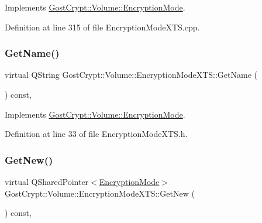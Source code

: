 Implements \hyperlink{class_gost_crypt_1_1_volume_1_1_encryption_mode_a2879197c50f2e834f22d87def6c3ec0f}{Gost\+Crypt\+::\+Volume\+::\+Encryption\+Mode}.



Definition at line 315 of file Encryption\+Mode\+X\+T\+S.\+cpp.

\mbox{\label{class_gost_crypt_1_1_volume_1_1_encryption_mode_x_t_s_a3e4b43e1295accb96021b03deaa5e7b1}} 
\subsubsection{\texorpdfstring{Get\+Name()}{GetName()}}
{\footnotesize\ttfamily virtual Q\+String Gost\+Crypt\+::\+Volume\+::\+Encryption\+Mode\+X\+T\+S\+::\+Get\+Name (\begin{DoxyParamCaption}{ }\end{DoxyParamCaption}) const\hspace{0.3cm}{\ttfamily [inline]}, {\ttfamily [virtual]}}



Implements \hyperlink{class_gost_crypt_1_1_volume_1_1_encryption_mode_a8b82c75eb29a3149b1dd171624c3ede1}{Gost\+Crypt\+::\+Volume\+::\+Encryption\+Mode}.



Definition at line 33 of file Encryption\+Mode\+X\+T\+S.\+h.

\mbox{\label{class_gost_crypt_1_1_volume_1_1_encryption_mode_x_t_s_a3d9c88420585ed76c1c11f541db973e1}} 
\subsubsection{\texorpdfstring{Get\+New()}{GetNew()}}
{\footnotesize\ttfamily virtual Q\+Shared\+Pointer$<$\hyperlink{class_gost_crypt_1_1_volume_1_1_encryption_mode}{Encryption\+Mode}$>$ Gost\+Crypt\+::\+Volume\+::\+Encryption\+Mode\+X\+T\+S\+::\+Get\+New (\begin{DoxyParamCaption}{ }\end{DoxyParamCaption}) const\hspace{0.3cm}{\ttfamily [inline]}, {\ttfamily [virtual]}}



